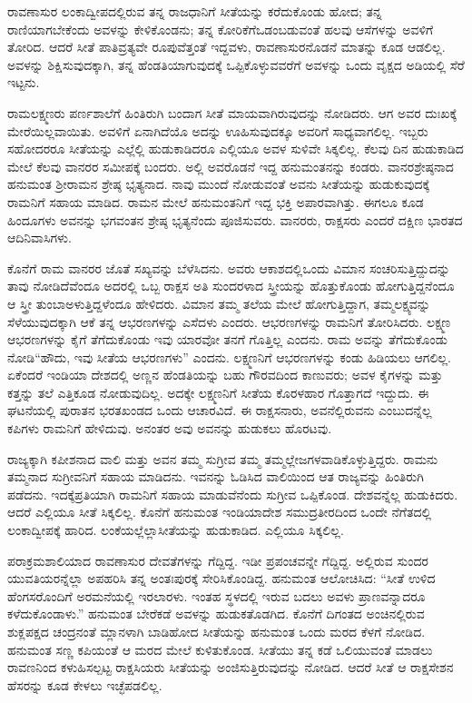 ರಾವಣಾಸುರ ಲಂಕಾದ್ವೀಪದಲ್ಲಿರುವ ತನ್ನ ರಾಜಧಾನಿಗೆ ಸೀತೆಯನ್ನು ಕರೆದುಕೊಂಡು ಹೋದ; ತನ್ನ ರಾಣಿಯಾಗಬೇಕೆಂದು ಅವಳನ್ನು ಕೇಳಿಕೊಂಡನು; ತನ್ನ ಕೋರಿಕೆಗೆ\break ಒಡಂಬಡುವಂತೆ ಹಲವು ಆಸೆಗಳನ್ನು ಅವಳಿಗೆ ತೋರಿದ. ಆದರೆ ಸೀತೆ ಪಾತಿವ್ರತ್ಯವೇ ರೂಪುವೆತ್ತಂತೆ ಇದ್ದವಳು, ರಾವಣಾಸುರನೊಡನೆ ಮಾತನ್ನು ಕೂಡ ಆಡಲಿಲ್ಲ. ಅವಳನ್ನು ಶಿಕ್ಷಿಸುವುದಕ್ಕಾಗಿ, ತನ್ನ ಹೆಂಡತಿಯಾಗುವುದಕ್ಕೆ ಒಪ್ಪಿಕೊಳ್ಳುವವರೆಗೆ ಅವಳನ್ನು ಒಂದು ವೃಕ್ಷದ ಅಡಿಯಲ್ಲಿ ಸೆರೆ ಇಟ್ಟನು.

ರಾಮಲಕ್ಷ್ಮಣರು ಪರ್ಣಶಾಲೆಗೆ ಹಿಂತಿರುಗಿ ಬಂದಾಗ ಸೀತೆ ಮಾಯವಾಗಿರುವುದನ್ನು ನೋಡಿದರು. ಆಗ ಅವರ ದುಃಖಕ್ಕೆ ಮೇರೆಯಿಲ್ಲವಾಯಿತು. ಅವಳಿಗೆ ಏನಾಗಿದೆಯೊ ಅದನ್ನು ಊಹಿಸುವುದಕ್ಕೂ ಅವರಿಗೆ ಸಾಧ್ಯವಾಗಲಿಲ್ಲ. ಇಬ್ಬರು ಸಹೋದರರೂ ಸೀತೆಯನ್ನು ಎಲ್ಲೆಲ್ಲಿ ಹುಡುಕಾಡಿದರೂ ಎಲ್ಲಿಯೂ ಅವಳ ಸುಳಿವೇ ಸಿಕ್ಕಲಿಲ್ಲ. ಕೆಲವು ದಿನ ಹುಡುಕಾಡಿದ ಮೇಲೆ ಕೆಲವು ವಾನರರ ಸಮೀಪಕ್ಕೆ ಬಂದರು. ಅಲ್ಲಿ ಅವರೊಡನೆ ಇದ್ದ ಹನುಮಂತನನ್ನು ಕಂಡರು. ವಾನರಶ್ರೇಷ್ಠನಾದ ಹನುಮಂತ ಶ‍್ರೀರಾಮನ ಶ್ರೇಷ್ಠ ಭೃತ್ಯನಾದ. ನಾವು ಮುಂದೆ ನೋಡುವಂತೆ ಅವನು ಸೀತೆಯನ್ನು ಹುಡುಕುವುದಕ್ಕೆ ರಾಮನಿಗೆ ಸಹಾಯ ಮಾಡಿದ. ರಾಮನ ಮೇಲೆ ಹನುಮಂತನಿಗೆ ಇದ್ದ ಭಕ್ತಿ ಅಪಾರವಾಗಿತ್ತು. ಈಗಲೂ ಕೂಡ ಹಿಂದೂಗಳು ಅವನನ್ನು ಭಗವಂತನ ಶ್ರೇಷ್ಠ ಭೃತ್ಯನೆಂದು ಪೂಜಿಸುವರು. ವಾನರರು, ರಾಕ್ಷಸರು ಎಂದರೆ ದಕ್ಷಿಣ ಭಾರತದ ಆದಿನಿವಾಸಿಗಳು.

ಕೊನೆಗೆ ರಾಮ ವಾನರರ ಜೊತೆ ಸಖ್ಯವನ್ನು ಬೆಳೆಸಿದನು. ಅವರು ಆಕಾಶದಲ್ಲಿ\break ಒಂದು ವಿಮಾನ ಸಂಚರಿಸುತ್ತಿದ್ದುದನ್ನು ತಾವು ನೋಡಿದೆವೆಂದೂ ಅದರಲ್ಲಿ ಒಬ್ಬ ರಾಕ್ಷಸ ಅತಿ ಸುಂದರಳಾದ ಸ್ತ್ರೀಯನ್ನು ಹೊತ್ತುಕೊಂಡು ಹೋಗುತ್ತಿದ್ದನೆಂದೂ ಆ ಸ್ತ್ರೀ ತುಂಬಾ\break ಅಳುತ್ತಿದ್ದಳೆಂದೂ ಹೇಳಿದರು. ವಿಮಾನ ತಮ್ಮ ತಲೆಯ ಮೇಲೆ ಹೋಗುತ್ತಿದ್ದಾಗ, ತಮ್ಮ\break ಲಕ್ಷ್ಯವನ್ನು ಸೆಳೆಯುವುದಕ್ಕಾಗಿ ಆಕೆ ತನ್ನ ಆಭರಣಗಳನ್ನು ಎಸೆದಳು ಎಂದರು. ಆಭರಣಗಳನ್ನು ರಾಮನಿಗೆ ತೋರಿಸಿದರು. ಲಕ್ಷ್ಮಣ ಆಭರಣಗಳನ್ನು ಕೈಗೆ ತೆಗೆದುಕೊಂಡು ಇವು ಯಾರವೋ ತನಗೆ ಗೊತ್ತಿಲ್ಲ ಎಂದನು. ರಾಮ ಅವನ್ನು ತೆಗೆದುಕೊಂಡು ನೋಡಿ\break “ಹೌದು, ಇವು ಸೀತೆಯ ಆಭರಣಗಳು” ಎಂದನು. ಲಕ್ಷ್ಮಣನಿಗೆ ಆಭರಣಗಳನ್ನು ಕಂಡು ಹಿಡಿಯಲು ಆಗಲಿಲ್ಲ. ಏಕೆಂದರೆ ಇಂಡಿಯಾ ದೇಶದಲ್ಲಿ ಅಣ್ಣನ ಹೆಂಡತಿಯನ್ನು ಬಹು ಗೌರವದಿಂದ ಕಾಣುವರು; ಅವಳ ಕೈಗಳನ್ನು ಮತ್ತು ಕತ್ತನ್ನು ತಲೆ ಎತ್ತಿಕೂಡ ನೋಡುವುದಿಲ್ಲ. ಅದಕ್ಕೇ ಲಕ್ಷ್ಮಣನಿಗೆ ಸೀತೆಯ ಕೊರಳಹಾರ ಗೊತ್ತಾಗದೆ ಇದ್ದುದು. ಈ ಘಟನೆಯಲ್ಲಿ ಪುರಾತನ ಭರತಖಂಡದ ಒಂದು ಆಚಾರವಿದೆ. ಈ ರಾಕ್ಷಸನಾರು, ಅವನೆಲ್ಲಿರುವನು ಎಂಬುದನ್ನೆಲ್ಲ ಕಪಿಗಳು ರಾಮನಿಗೆ ಹೇಳಿದುವು. ಅನಂತರ ಅವು ಅವನನ್ನು ಹುಡುಕಲು ಹೊರಟವು.

ರಾಜ್ಯಕ್ಕಾಗಿ ಕಪೀಶನಾದ ವಾಲಿ ಮತ್ತು ಅವನ ತಮ್ಮ ಸುಗ್ರೀವ ತಮ್ಮ ತಮ್ಮಲ್ಲೇ\break ಜಗಳವಾಡಿಕೊಳ್ಳುತ್ತಿದ್ದರು. ರಾಮನು ತಮ್ಮನಾದ ಸುಗ್ರೀವನಿಗೆ ಸಹಾಯ ಮಾಡಿದನು. ಇವನನ್ನು ಓಡಿಸಿದ ವಾಲಿಯಿಂದ ಆತ ರಾಜ್ಯವನ್ನು ಹಿಂತಿರುಗಿ ಪಡೆದನು. ಇದಕ್ಕೆ\break ಪ್ರತಿಯಾಗಿ ರಾಮನಿಗೆ ಸಹಾಯ ಮಾಡುವೆನೆಂದು ಸುಗ್ರೀವ ಒಪ್ಪಿಕೊಂಡ. ದೇಶವನ್ನೆಲ್ಲ ಹುಡುಕಿದರು. ಆದರೆ ಎಲ್ಲಿಯೂ ಸೀತೆ ಸಿಕ್ಕಲಿಲ್ಲ. ಕೊನೆಗೆ ಹನುಮಂತ ಇಂಡಿಯಾದೇಶ ಸಮುದ್ರತೀರದಿಂದ ಒಂದೇ ನೆಗೆತದಲ್ಲಿ ಲಂಕಾದ್ವೀಪಕ್ಕೆ ಹಾರಿದ. ಲಂಕೆಯಲ್ಲೆಲ್ಲಾ\break ಸೀತೆಯನ್ನು ಹುಡುಕಾಡಿದ. ಎಲ್ಲಿಯೂ ಸಿಕ್ಕಲಿಲ್ಲ.

ಪರಾಕ್ರಮಶಾಲಿಯಾದ ರಾವಣಾಸುರ ದೇವತೆಗಳನ್ನು ಗೆದ್ದಿದ್ದ. ಇಡೀ ಪ್ರಪಂಚವನ್ನೇ ಗೆದ್ದಿದ್ದ. ಅಲ್ಲಿರುವ ಸುಂದರ ಯುವತಿಯರನ್ನೆಲ್ಲಾ ಅಪಹರಿಸಿ ತನ್ನ ಅಂತಃಪುರಕ್ಕೆ ಸೇರಿಸಿಕೊಂಡಿದ್ದ. ಹನುಮಂತ ಆಲೋಚಿಸಿದ: “ಸೀತೆ ಉಳಿದ ಹೆಂಗಸರೊಂದಿಗೆ ಅರಮನೆಯಲ್ಲಿ ಇರಲಾರಳು. ಇಂತಹ ಸ್ಥಳದಲ್ಲಿ ಇರುವ ಬದಲು ಅವಳು ಪ್ರಾಣವನ್ನಾದರೂ ಕಳೆದುಕೊಂಡಾಳು.” ಹನುಮಂತ ಬೇರೆಕಡೆ ಅವಳನ್ನು ಹುಡುಕತೊಡಗಿದ. ಕೊನೆಗೆ ದಿಗಂತದ ಅಂಚಿನಲ್ಲಿರುವ ಶುಕ್ಲಪಕ್ಷದ ಚಂದ್ರನಂತೆ ಮ್ಲಾನಳಾಗಿ ಬಾಡಿಹೋದ ಸೀತೆಯನ್ನು ಹನುಮಂತ ಒಂದು ಮರದ ಕೆಳಗೆ ನೋಡಿದ. ಹನುಮಂತ ಸಣ್ಣ ಕಪಿಯಂತೆ ಆ ಮರದ ಮೇಲೆ ಕುಳಿತುಕೊಂಡ. ಸೀತೆಯು ತನ್ನ ಕಡೆ ಒಲಿಯುವಂತೆ ಮಾಡಲು ರಾವಣನಿಂದ ಕಳುಹಿಸಲ್ಪಟ್ಟ ರಾಕ್ಷಸಿಯರು ಸೀತೆಯನ್ನು ಅಂಜಿಸುತ್ತಿರುವುದನ್ನು ನೋಡಿದ. ಆದರೆ ಸೀತೆ ಆ ರಾಕ್ಷಸೇಶನ ಹೆಸರನ್ನು ಕೂಡ ಕೇಳಲು ಇಚ್ಛೆಪಡಲಿಲ್ಲ.

